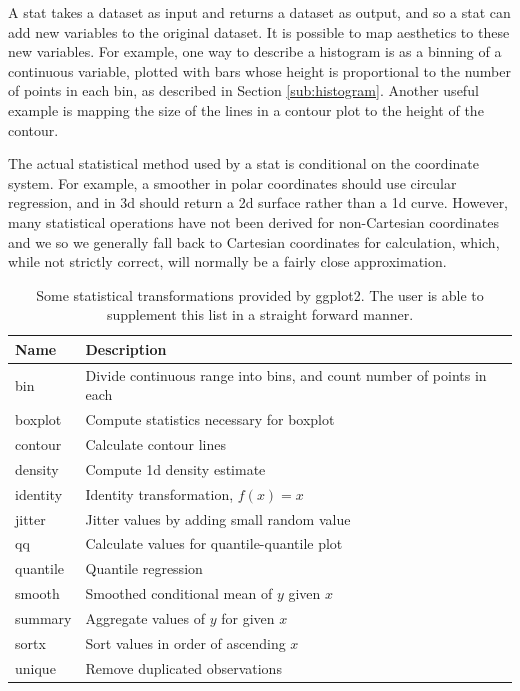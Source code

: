 A stat takes a dataset as input and returns a dataset as output, and so a stat can add new variables to the original dataset.  It is possible to map aesthetics to these new variables.  For example, one way to describe a histogram is as a binning of a continuous variable, plotted with bars whose height is proportional to the number of points in each bin, as described in Section \ref{sub:histogram}.  Another useful example is mapping the size of the lines in a contour plot to the height of the contour.

The actual statistical method used by a stat is conditional on the coordinate system.  For example, a smoother in polar coordinates should use circular regression, and in 3d should return a 2d surface rather than a 1d curve.  However, many statistical operations have not been derived for non-Cartesian coordinates and we so we generally fall back to Cartesian coordinates for calculation, which, while not strictly correct, will normally be a fairly close approximation.  

\begin{table}
  \begin{center}
  \begin{tabular}{l|l}
  Name & Description \\
  \hline
  bin & Divide continuous range into bins, and count number of points in each\\ 
  boxplot & Compute statistics necessary for boxplot\\
  contour & Calculate contour lines\\
  density & Compute 1d density estimate \\
  identity & Identity transformation, $f(x) = x$ \\
  jitter & Jitter values by adding small random value \\
  qq & Calculate values for quantile-quantile plot \\
  quantile & Quantile regression\\
  smooth & Smoothed conditional mean of $y$ given $x$ \\
  summary & Aggregate values of $y$ for given $x$ \\
  sortx & Sort values in order of ascending $x$\\
  unique & Remove duplicated observations\\
  \end{tabular}
  \end{center}
  \caption{Some statistical transformations provided by ggplot2.  The user is able to supplement this list in a straight forward manner.}
  \label{tbl:statistics}
\end{table}

